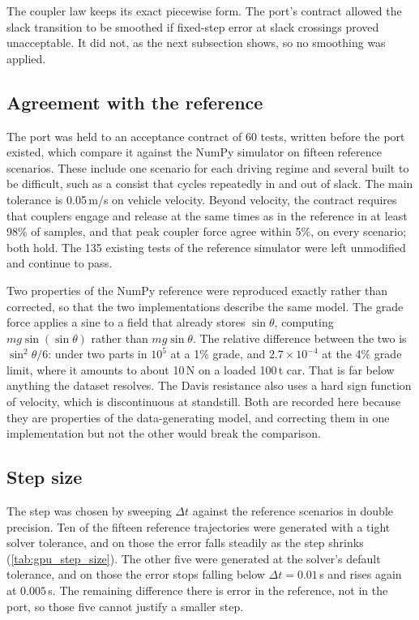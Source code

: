 The coupler law keeps its exact piecewise form. The port's contract allowed the slack transition to be smoothed if fixed-step error at slack crossings proved unacceptable. It did not, as the next subsection shows, so no smoothing was applied.

\subsection{Agreement with the reference}

The port was held to an acceptance contract of 60 tests, written before the port existed, which compare it against the NumPy simulator on fifteen reference scenarios. These include one scenario for each driving regime and several built to be difficult, such as a consist that cycles repeatedly in and out of slack. The main tolerance is 0.05\,m/s on vehicle velocity. Beyond velocity, the contract requires that couplers engage and release at the same times as in the reference in at least 98\% of samples, and that peak coupler force agree within 5\%, on every scenario; both hold. The 135 existing tests of the reference simulator were left unmodified and continue to pass.

Two properties of the NumPy reference were reproduced exactly rather than corrected, so that the two implementations describe the same model. The grade force applies a sine to a field that already stores $\sin\theta$, computing $mg\sin(\sin\theta)$ rather than $mg\sin\theta$. The relative difference between the two is $\sin^{2}\theta/6$: under two parts in $10^{5}$ at a 1\% grade, and $2.7\times10^{-4}$ at the 4\% grade limit, where it amounts to about 10\,N on a loaded 100\,t car. That is far below anything the dataset resolves. The Davis resistance also uses a hard sign function of velocity, which is discontinuous at standstill. Both are recorded here because they are properties of the data-generating model, and correcting them in one implementation but not the other would break the comparison.

\subsection{Step size}

The step was chosen by sweeping $\Delta t$ against the reference scenarios in double precision. Ten of the fifteen reference trajectories were generated with a tight solver tolerance, and on those the error falls steadily as the step shrinks (\cref{tab:gpu_step_size}). The other five were generated at the solver's default tolerance, and on those the error stops falling below $\Delta t = 0.01$\,s and rises again at $0.005$\,s. The remaining difference there is error in the reference, not in the port, so those five cannot justify a smaller step.

